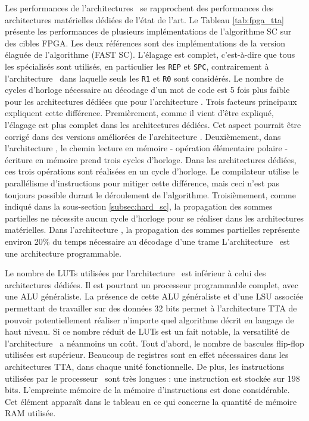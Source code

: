 Les performances de l'architectures \TTSC~se rapprochent des performances des architectures matérielles dédiées de l'état de l'art. Le Tableau \ref{tab:fpga_tta} présente les performances de plusieurs implémentations de l'algorithme SC sur des cibles FPGA. Les deux références \cite{sarkis_fast_2014,giard_638_2015} sont des implémentations de la version élaguée de l'algorithme (FAST SC). L'élagage est complet, c'est-à-dire que tous les \noeuds spécialisés sont utilisés, en particulier les \noeuds \texttt{REP} et \texttt{SPC}, contrairement à l'architecture \TTSC~dans laquelle seuls les \noeuds \texttt{R1} et \texttt{R0} sont considérés. Le nombre de cycles d'horloge nécessaire au décodage d'un mot de code est 5 fois plus faible pour les architectures dédiées que pour l'architecture \TTSC. Trois facteurs principaux expliquent cette différence. Premièrement, comme il vient d'être expliqué, l'élagage est plus complet dans les architectures dédiées. Cet aspect pourrait être corrigé dans des versions améliorées de l'architecture \TTSC. Deuxièmement, dans l'architecture \TTSC, le chemin lecture en mémoire - opération élémentaire polaire - écriture en mémoire prend trois cycles d'horloge. Dans les architectures dédiées, ces trois opérations sont réalisées en un cycle d'horloge. Le compilateur utilise le parallélisme d'instructions pour mitiger cette différence, mais ceci n'est pas toujours possible durant le déroulement de l'algorithme. Troisièmement, comme indiqué dans la sous-section \ref{subsec:hard_sc}, la propagation des sommes partielles ne nécessite aucun cycle d'horloge pour se réaliser dans les architectures matérielles. Dans l'architecture \TTSC, la propagation des sommes partielles représente environ 20\% du temps nécessaire au décodage d'une trame
L'architecture \TTSC~est une architecture programmable. 


Le nombre de LUTs utilisées par l'architecture \TTSC~est inférieur à celui des architectures dédiées. Il est pourtant un processeur programmable complet, avec une ALU généraliste. La présence de cette ALU généraliste et d'une LSU associée permettant de travailler sur des données 32 bits permet à l'architecture TTA de pouvoir potentiellement réaliser n'importe quel algorithme décrit en langage de haut niveau. Si ce nombre réduit de LUTs est un fait notable, la versatilité de l'architecture \TTSC~a néanmoins un coût. Tout d'abord, le nombre de bascules flip-flop utilisées est supérieur. Beaucoup de registres sont en effet nécessaires dans les architectures TTA, dans chaque unité fonctionnelle. De plus, les instructions utilisées par le processeur \TTSC~sont très longues : une instruction est stockée sur 198 bits. L'empreinte mémoire de la mémoire d'instructions est donc considérable. Cet élément apparaît dans le tableau en ce qui concerne la quantité de mémoire RAM utilisée.



